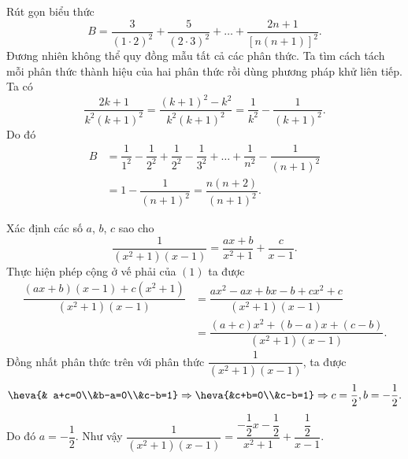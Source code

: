 \begin{vd}%
 Rút gọn biểu thức
 $$B = \dfrac{3}{(1\cdot 2)^2}+\dfrac{5}{(2\cdot 3)^2}+\dots + \dfrac{2n+1}{\left[ n(n+1)\right]^2}.$$
 \loigiai
  {
	Đương nhiên không thể quy đồng mẫu tất cả các phân thức. Ta tìm cách tách mỗi phân thức thành hiệu của hai phân thức rồi dùng phương pháp khử liên tiếp. Ta có
	$$\dfrac{2k+1}{k^2(k+1)^2} = \dfrac{(k+1)^2-k^2}{k^2(k+1)^2} = \dfrac{1}{k^2} - \dfrac{1}{(k+1)^2}.$$
	Do đó
	$$\begin{array}{ll}
	B& = \dfrac{1}{1^2}-\dfrac{1}{2^2}+\dfrac{1}{2^2}-\dfrac{1}{3^2}+\dots+\dfrac{1}{n^2}-\dfrac{1}{(n+1)^2}\\
	& = 1-\dfrac{1}{(n+1)^2} = \dfrac{n(n+2)}{(n+1)^2}.
	\end{array}$$	
  }
\end{vd}

\begin{vd}%
 Xác định các số $a$, $b$, $c$ sao cho
 \[\dfrac{1}{(x^2+1)(x-1)}=\dfrac{ax+b}{x^2+1}+\dfrac{c}{x-1}.\tag{1}\]
 \loigiai
  {
	Thực hiện phép cộng ở vế phải của $(1)$ ta được
	$$\begin{array}{ll}
	\dfrac{(ax+b)(x-1)+c(x^2+1)}{(x^2+1)(x-1)}& = \dfrac{ax^2-ax+bx-b+cx^2+c}{(x^2+1)(x-1)}\\
	& = \dfrac{(a+c)x^2+(b-a)x+(c-b)}{(x^2+1)(x-1)}.
	\end{array}$$
	Đồng nhất phân thức trên với phân thức $\dfrac{1}{(x^2+1)(x-1)}$, ta được
	$$\heva{& a+c=0\\&b-a=0\\&c-b=1}\Rightarrow \heva{&c+b=0\\&c-b=1}\Rightarrow c=\dfrac{1}{2}, b=-\dfrac{1}{2}.$$
	Do đó $a=-\dfrac{1}{2}$. Như vậy $\dfrac{1}{(x^2+1)(x-1)}=\dfrac{-\dfrac{1}{2}x-\dfrac{1}{2}}{x^2+1}+\dfrac{\dfrac{1}{2}
	}{x-1}$.
  }
\end{vd}

